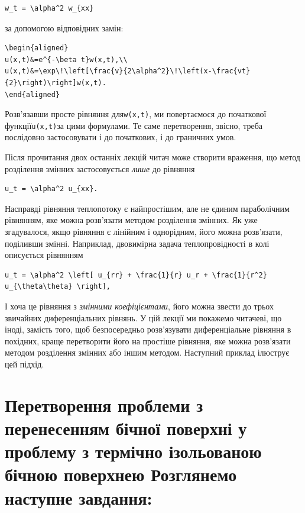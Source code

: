 \documentclass[
  ukrainian,
]{article}
\begin{document}
\begin{verbatim}
w_t = \alpha^2 w_{xx}
\end{verbatim}

за допомогою відповідних замін:

\begin{verbatim}
\begin{aligned}
u(x,t)&=e^{-\beta t}w(x,t),\\
u(x,t)&=\exp\!\left[\frac{v}{2\alpha^2}\!\left(x-\frac{vt}{2}\right)\right]w(x,t).
\end{aligned}
\end{verbatim}

Розв'язавши просте рівняння для\texttt{w(x,t)}, ми повертаємося до
початкової функції\texttt{u(x,t)}за цими формулами. Те саме
перетворення, звісно, треба послідовно застосовувати і до початкових, і
до граничних умов.

Після прочитання двох останніх лекцій читач може створити враження, що
метод розділення змінних застосовується \emph{лише} до рівняння

\begin{verbatim}
u_t = \alpha^2 u_{xx}.
\end{verbatim}

Насправді рівняння теплопотоку є найпростішим, але не єдиним
параболічним рівнянням, яке можна розв'язати методом розділення змінних.
Як уже згадувалося, якщо рівняння є лінійним і однорідним, його можна
розв'язати, поділивши змінні. Наприклад, двовимірна задача
теплопровідності в колі описується рівнянням

\begin{verbatim}
u_t = \alpha^2 \left[ u_{rr} + \frac{1}{r} u_r + \frac{1}{r^2} u_{\theta\theta} \right],
\end{verbatim}

І хоча це рівняння з \emph{змінними коефіцієнтами}, його можна звести до
трьох звичайних диференціальних рівнянь. У цій лекції ми покажемо
читачеві, що іноді, замість того, щоб безпосередньо розв'язувати
диференціальне рівняння в похідних, краще перетворити його на простіше
рівняння, яке можна розв'язати методом розділення змінних або іншим
методом. Наступний приклад ілюструє цей підхід.

\section{Перетворення проблеми з перенесенням бічної поверхні у проблему
з термічно ізольованою бічною поверхнею Розглянемо наступне
завдання:}\label{ux43fux435ux440ux435ux442ux432ux43eux440ux435ux43dux43dux44f-ux43fux440ux43eux431ux43bux435ux43cux438-ux437-ux43fux435ux440ux435ux43dux435ux441ux435ux43dux43dux44fux43c-ux431ux456ux447ux43dux43eux457-ux43fux43eux432ux435ux440ux445ux43dux456-ux443-ux43fux440ux43eux431ux43bux435ux43cux443-ux437-ux442ux435ux440ux43cux456ux447ux43dux43e-ux456ux437ux43eux43bux44cux43eux432ux430ux43dux43eux44e-ux431ux456ux447ux43dux43eux44e-ux43fux43eux432ux435ux440ux445ux43dux435ux44e-ux440ux43eux437ux433ux43bux44fux43dux435ux43cux43e-ux43dux430ux441ux442ux443ux43fux43dux435-ux437ux430ux432ux434ux430ux43dux43dux44f}
\end{document}
